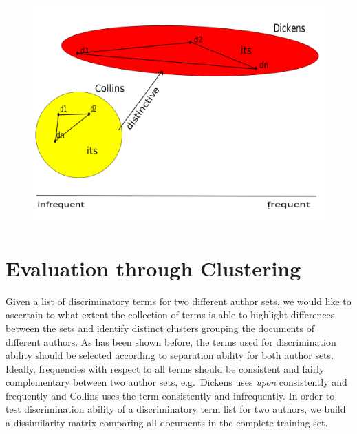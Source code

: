 \documentclass[a4paper,10pt,twoside,fleqn]{article}
\begin{document}
\begin{figure}[!htb]
  \includegraphics[scale=0.2,width=\linewidth]{figures/distinc2-fin.png}
 \endminipage
\end{figure}
 
 
 
 
 
 
 
 
\section{Evaluation through Clustering}

Given a list of discriminatory terms for two different author sets, we would like to ascertain to what extent the collection of terms is able to 
highlight differences between the sets and identify distinct clusters grouping the documents of different authors. 
As has been shown before, the terms used for discrimination ability should be selected according to separation ability for both author sets. 
Ideally, frequencies with respect to all terms should be consistent and fairly complementary between two author sets, e.g.~Dickens uses \emph{upon} 
consistently and frequently and Collins uses the term consistently and infrequently. 
In order to test discrimination ability of a discriminatory term list for two authors, we build a dissimilarity matrix comparing all documents in 
the complete training set. 
\end{document}
